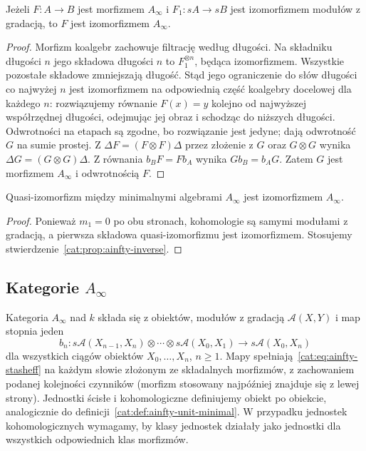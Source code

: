 \begin{stwierdzenie}\label{cat:prop:ainfty-inverse}
Jeżeli $F:A\to B$ jest morfizmem $A_\infty$ i $F_1:sA\to sB$ jest izomorfizmem modułów z gradacją, to $F$ jest izomorfizmem $A_\infty$.
\end{stwierdzenie}
\begin{proof}
Morfizm koalgebr zachowuje filtrację według długości. Na składniku długości $n$ jego składowa długości $n$ to $F_1^{\otimes n}$, będąca izomorfizmem. Wszystkie pozostałe składowe zmniejszają długość. Stąd jego ograniczenie do słów długości co najwyżej $n$ jest izomorfizmem na odpowiednią część koalgebry docelowej dla każdego $n$:  rozwiązujemy równanie $F(x)=y$ kolejno od najwyższej współrzędnej długości, odejmując jej obraz i schodząc do niższych długości. Odwrotności na etapach są zgodne, bo rozwiązanie jest jedyne; dają odwrotność $G$ na sumie prostej. Z $\Delta F=(F\otimes F)\Delta$ przez złożenie z $G$ oraz $G\otimes G$ wynika $\Delta G=(G\otimes G)\Delta$. Z równania $b_B F=F b_A$ wynika $G b_B=b_A G$. Zatem $G$ jest morfizmem $A_\infty$ i odwrotnością $F$.
\end{proof}

\begin{wniosek}\label{cat:cor:ainfty-minimal-iso}
Quasi-izomorfizm między minimalnymi algebrami $A_\infty$ jest izomorfizmem $A_\infty$.
\end{wniosek}
\begin{proof}
Ponieważ $m_1=0$ po obu stronach, kohomologie są samymi modułami z gradacją, a pierwsza składowa quasi-izomorfizmu jest izomorfizmem. Stosujemy stwierdzenie~\ref{cat:prop:ainfty-inverse}.
\end{proof}

\subsection{\texorpdfstring{Kategorie $A_\infty$}{Kategorie A-infty}}

\begin{definicja}\label{cat:def:ainfty-category}
Kategoria $A_\infty$ nad $k$ składa się z obiektów, modułów z gradacją $\mathcal A(X,Y)$ i map stopnia jeden
\[
 b_n:s\mathcal A(X_{n-1},X_n)\otimes\cdots\otimes
 s\mathcal A(X_0,X_1)\to s\mathcal A(X_0,X_n)
\]
dla wszystkich ciągów obiektów $X_0,\ldots,X_n$, $n\geq1$. Mapy spełniają~\eqref{cat:eq:ainfty-stasheff} na każdym słowie złożonym ze składalnych morfizmów, z zachowaniem podanej kolejności czynników (morfizm stosowany najpóźniej znajduje się z lewej strony). Jednostki ścisłe i kohomologiczne definiujemy obiekt po obiekcie, analogicznie do definicji~\ref{cat:def:ainfty-unit-minimal}. W przypadku jednostek kohomologicznych wymagamy, by klasy jednostek działały jako jednostki dla wszystkich odpowiednich klas morfizmów.
\end{definicja}

